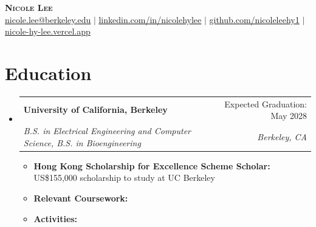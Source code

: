 \documentclass[letterpaper,10pt]{article}
\makeatletter
\newcommand{\resumeItem}[1]{\item\small{{#1 \vspace{-2pt}}}}
\newcommand{\resumeSubheading}[4]{
  \vspace{-2pt}\item
    \begin{tabular*}{0.97\textwidth}[t]{l@{\extracolsep{\fill}}r}
      \textbf{#1} & #2 \\
      \textit{\small#3} & \textit{\small #4} \\
    \end{tabular*}\vspace{-7pt}
}
\newcommand{\resumeSubHeadingListStart}{\begin{itemize}[leftmargin=0.15in, label={}]}
\newcommand{\resumeSubHeadingListEnd}{\end{itemize}}
\newcommand{\resumeItemListStart}{\begin{itemize}}
\newcommand{\resumeItemListEnd}{\end{itemize}\vspace{-5pt}}
\makeatother
\begin{document}
\begin{center}
    \textbf{\LARGE \scshape Nicole Lee} \\ \vspace{1pt}
    \small \href{mailto:nicole.lee@berkeley.edu}{\underline{nicole.lee@berkeley.edu}} $|$
    \href{https://linkedin.com/in/nicolehylee/}{\underline{linkedin.com/in/nicolehylee}} $|$
    \href{https://github.com/nicoleleehy1}{\underline{github.com/nicoleleehy1}} $|$
    \href{https://nicole-hy-lee.vercel.app/}{\underline{nicole-hy-lee.vercel.app}}
\end{center}

\section{Education}
  \resumeSubHeadingListStart
    \resumeSubheading
      {University of California, Berkeley}{Expected Graduation: May 2028}
      {B.S. in Electrical Engineering and Computer Science, B.S. in Bioengineering}{Berkeley, CA}
      \resumeItemListStart
        \resumeItem{\textbf{Hong Kong Scholarship for Excellence Scheme Scholar:} US\$155,000 scholarship to study at UC Berkeley}
        \resumeItem{\textbf{Relevant Coursework:} \COURSEWORK}
        \resumeItem{\textbf{Activities:} \ACTIVITIES}
      \resumeItemListEnd
  \resumeSubHeadingListEnd
\end{document}
